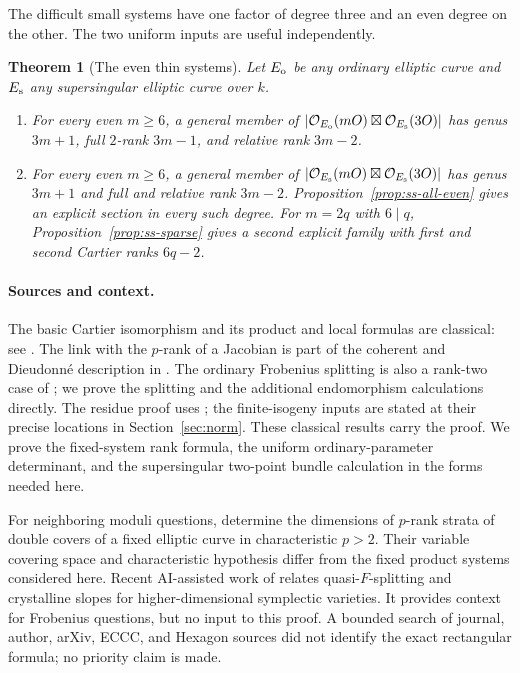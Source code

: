\documentclass[11pt]{article}
\newtheorem{theorem}{Theorem}[section]
\theoremstyle{definition}\newtheorem{definition}[theorem]{Definition}
\theoremstyle{remark}\newtheorem{remark}[theorem]{Remark}
\newcommand{\OO}{\mathcal O}
\begin{document}
The difficult small systems have one factor of degree three and an even degree on the other. The two uniform inputs are useful independently.

\begin{theorem}[The even thin systems]\label{thm:thin}
Let $E_{\rm o}$ be any ordinary elliptic curve and $E_{\rm s}$ any supersingular elliptic curve over $k$.
\begin{enumerate}
\item For every even $m\ge6$, a general member of
$|\OO_{E_{\rm o}}(mO)\boxtimes\OO_{E_{\rm s}}(3O)|$ has genus $3m+1$, full $2$-rank $3m-1$, and relative rank $3m-2$.
\item For every even $m\ge6$, a general member of
$|\OO_{E_{\rm s}}(mO)\boxtimes\OO_{E_{\rm s}}(3O)|$ has genus $3m+1$ and full and relative rank $3m-2$. Proposition~\ref{prop:ss-all-even} gives an explicit section in every such degree. For $m=2q$ with $6\mid q$, Proposition~\ref{prop:ss-sparse} gives a second explicit family with first and second Cartier ranks $6q-2$.
\end{enumerate}
\end{theorem}

\paragraph{Sources and context.}
The basic Cartier isomorphism and its product and local formulas are classical: see \citet[0, (2.1.4)--(2.1.13), pp.~514--515]{Illusie}. The link with the $p$-rank of a Jacobian is part of the coherent and Dieudonn\'e description in \citet[Propositions~3.18 and 3.22--3.24, pp.~89, 99--101]{Oda}. The ordinary Frobenius splitting is also a rank-two case of \citet[Corollary~1.7, pp.~53--54]{Oda1971}; we prove the splitting and the additional endomorphism calculations directly. The residue proof uses \citet[Theorems~2--3 and the corollary, pp.~155--156; \S4 and Theorem~5, pp.~157--159]{Tate}; the finite-isogeny inputs are stated at their precise locations in Section~\ref{sec:norm}. These classical results carry the proof. We prove the fixed-system rank formula, the uniform ordinary-parameter determinant, and the supersingular two-point bundle calculation in the forms needed here.

For neighboring moduli questions, \citet[Theorem~1.1, p.~2]{ChangEtAl} determine the dimensions of $p$-rank strata of double covers of a fixed elliptic curve in characteristic $p>2$. Their variable covering space and characteristic hypothesis differ from the fixed product systems considered here. Recent AI-assisted work of \citet[Introduction, Theorems~A--C, and acknowledgements]{Zou} relates quasi-$F$-splitting and crystalline slopes for higher-dimensional symplectic varieties. It provides context for Frobenius questions, but no input to this proof. A bounded search of journal, author, arXiv, ECCC, and Hexagon sources did not identify the exact rectangular formula; no priority claim is made.
\end{document}
